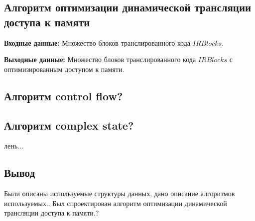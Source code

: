 \begin{comment}
{
	+  int State = NOT_CHANGED;
	+  std::set<OrderedNode*> StackNodes;
	+  std::set<OrderedNode*> UnStackNodes;
	+  std::vector<OrderedNode*> Predecessors;
	+  // std::vector<OrderedNode*> Successors;
	+  bool Visited = false;
	+};
+
\end{comment}

\subsection{Алгоритм оптимизации динамической трансляции доступа к памяти}

\textbf{Входные данные:} Множество блоков транслированного кода $IRBlocks$.

\textbf{Выходные данные:} Множество блоков транслированного кода $IRBlocks$ с оптимизированным доступом к памяти.

\subsection{Алгоритм control flow?}

\subsection{Алгоритм complex state?}

лень...

\subsection{Вывод}

Были описаны используемые структуры данных, дано описание алгоритмов используемых.. Был спроектирован алгоритм оптимизации динамической трансляции доступа к памяти.?

\pagebreak